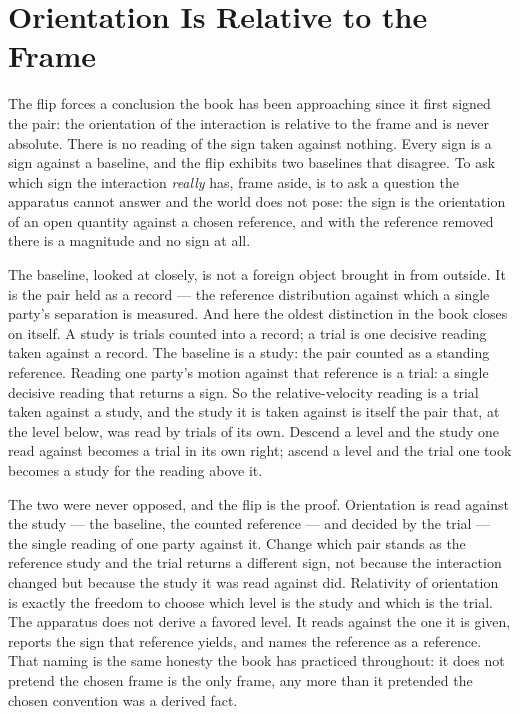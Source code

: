 \section{Orientation Is Relative to the Frame}

The flip forces a conclusion the book has been approaching since it first signed the pair:
the orientation of the interaction is relative to the frame and is never absolute. There is no
reading of the sign taken against nothing. Every sign is a sign against a baseline, and the
flip exhibits two baselines that disagree. To ask which sign the interaction \emph{really}
has, frame aside, is to ask a question the apparatus cannot answer and the world does not
pose: the sign is the orientation of an open quantity against a chosen reference, and with the
reference removed there is a magnitude and no sign at all.

The baseline, looked at closely, is not a foreign object brought in from outside. It is the
pair held as a record --- the reference distribution against which a single party's separation
is measured. And here the oldest distinction in the book closes on itself. A study is trials
counted into a record; a trial is one decisive reading taken against a record. The baseline is
a study: the pair counted as a standing reference. Reading one party's motion against that
reference is a trial: a single decisive reading that returns a sign. So the relative-velocity
reading is a trial taken against a study, and the study it is taken against is itself the pair
that, at the level below, was read by trials of its own. Descend a level and the study one
read against becomes a trial in its own right; ascend a level and the trial one took becomes a
study for the reading above it.

The two were never opposed, and the flip is the proof. Orientation is read against the study
--- the baseline, the counted reference --- and decided by the trial --- the single reading of one
party against it. Change which pair stands as the reference study and the trial returns a
different sign, not because the interaction changed but because the study it was read against
did. Relativity of orientation is exactly the freedom to choose which level is the study and
which is the trial. The apparatus does not derive a favored level. It reads against the one it
is given, reports the sign that reference yields, and names the reference as a reference. That
naming is the same honesty the book has practiced throughout: it does not pretend the chosen
frame is the only frame, any more than it pretended the chosen convention was a derived fact.

